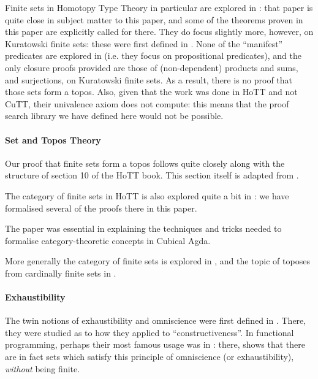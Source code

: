 Finite sets in Homotopy Type Theory in particular are explored in
\citet{fruminFiniteSetsHomotopy2018}: that paper is quite close in subject
matter to this paper, and some of the theorems proven in this paper are
explicitly called for there.
They do focus slightly more, however, on Kuratowski finite sets: these were
first defined in \citet{kuratowskiNotionEnsembleFini1920}.
None of the ``manifest'' predicates are explored in
\citet{fruminFiniteSetsHomotopy2018} (i.e. they focus on propositional
predicates), and the only closure proofs provided are those of (non-dependent)
products and sums, and surjections, on Kuratowski finite sets.
As a result, there is no proof that those sets form a topos.
Also, given that the work was done in HoTT and not CuTT, their univalence axiom
does not compute: this means that the proof search library we have defined here
would not be possible.
\paragraph{Set and Topos Theory}
Our proof that finite sets form a topos follows quite closely along with the
structure of section 10 of the HoTT book.
This section itself is adapted from \citet{rijkeSetsHomotopyType2015}.

The category of finite sets in HoTT is also explored quite a bit in
\citet{yorgeyCombinatorialSpeciesLabelled2014}: we have formalised several of
the proofs there in this paper.

The paper \citet{iversenUnivalentCategoriesFormalization2018} was essential in
explaining the techniques and tricks needed to formalise category-theoretic
concepts in Cubical Agda.

More generally the category of finite sets is explored in
\citet{solovevCategoryFiniteSets1983}, and the topic of toposes from cardinally
finite sets in \citet{henryToposesGeneratedCardinal2018}.
\paragraph{Exhaustibility}
The twin notions of exhaustibility and omniscience were first defined in
\citet{bishopFoundationsConstructiveAnalysis1967}.
There, they were studied as to how they applied to ``constructiveness''.
In functional programming, perhaps their most famous usage was in
\citet{escardoInfiniteSetsThat2013}: there,
\citeauthor{escardoInfiniteSetsThat2013} shows that there are in fact sets which
satisfy this principle of omniscience (or exhaustibility), \emph{without} being
finite.
